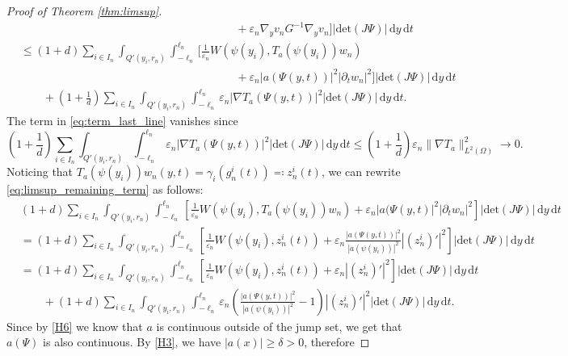 \documentclass[a4paper, 11pt, reqno]{amsart}
\theoremstyle{plain}
\theoremstyle{definition}
\theoremstyle{remark}
\newcommand{\dd}{\,\mathrm{d}}
\begin{document}
\begin{proof}[Proof of Theorem \ref{thm:limsup}]
\begin{align}
    &\hspace{8cm}+ \varepsilon_n \nabla_y v_n G^{-1} \nabla_y v_n \bigg] | \mathrm{det}(J\Psi)| \dd y \dd t \nonumber \\
    &\leq (1+d) \sum_{i \in I_n} \int_{Q'(y_i,r_n)} \int_{-\ell_n}^{\ell_n} \bigg[ \frac{1}{\varepsilon_n} W(\psi(y_i), T_a(\psi(y_i))w_n) \nonumber \\
    &\hspace{8cm}+ \varepsilon_n |a(\Psi(y,t))|^2 | \partial_t w_n|^2 \bigg] | \mathrm{det}(J\Psi)| \dd y \dd t \label{eq:limsup_remaining_term} \\
    &\qquad+ \left( 1 + \frac1d \right) \sum_{i \in I_n} \int_{Q'(y_i,r_n)} \int_{-\ell_n}^{\ell_n} \varepsilon_n | \nabla T_a (\Psi(y,t)) |^2 | \mathrm{det}(J\Psi)| \dd y \dd t. \label{eq:term_last_line}
\end{align}
The term in \eqref{eq:term_last_line} vanishes since
$$ \left( 1 + \frac1d \right) \sum_{i \in I_n} \int_{Q'(y_i,r_n)} \int_{-\ell_n}^{\ell_n} \varepsilon_n | \nabla T_a(\Psi(y,t)) |^2 | \mathrm{det}(J\Psi)| \dd y \dd t \leq \left( 1 + \frac1d \right) \varepsilon_n \| \nabla T_a \|^2_{L^2(\Omega)} \to 0. $$
Noticing that $T_a(\psi(y_i)) w_n(y,t) = \gamma_i (g_n^i(t)) \eqqcolon z_n^i (t)$, we can rewrite \eqref{eq:limsup_remaining_term} as follows:
\begin{align}
    &(1+d) \sum_{i \in I_n} \int_{Q'(y_i,r_n)} \int_{-\ell_n}^{\ell_n} \left[ \frac{1}{\varepsilon_n} W(\psi(y_i), T_a(\psi(y_i))w_n) + \varepsilon_n |a(\Psi(y,t)|^2 | \partial_t w_n|^2 \right] | \mathrm{det} (J\Psi)| \dd y \dd t \nonumber \\
    &= (1+d) \sum_{i \in I_n} \int_{Q'(y_i,r_n)} \int_{-\ell_n}^{\ell_n} \left[ \frac{1}{\varepsilon_n} W(\psi(y_i), z_n^i(t)) + \varepsilon_n \frac{|a(\Psi(y,t))|^2}{|a(\psi(y_i))|^2} |(z_n^i)'|^2 \right] | \mathrm{det} (J\Psi)| \dd y \dd t \nonumber \\
    &= (1+d) \sum_{i \in I_n} \int_{Q'(y_i,r_n)} \int_{-\ell_n}^{\ell_n} \left[ \frac{1}{\varepsilon_n} W(\psi(y_i), z_n^i(t)) + \varepsilon_n | (z_n^i)' |^2 \right] | \mathrm{det} (J\Psi)| \dd y \dd t \label{eq:limsup_remaining_term_last}\\
    &\qquad+ (1+d) \sum_{i \in I_n} \int_{Q'(y_i,r_n)} \int_{-\ell_n}^{\ell_n} \varepsilon_n \left( \frac{|a(\Psi(y,t))|^2}{|a(\psi(y_i))|^2} - 1 \right) | (z_n^i)'|^2 | \mathrm{det} (J\Psi)| \dd y \dd t \label{eq:limsup_afraction}.
\end{align}
Since by \ref{H6} we know that $a$ is continuous outside of the jump set, we get that $a(\Psi)$ is also continuous. By \ref{H3}, we have $|a(x)| \geq \delta > 0$, therefore

\end{proof}
\end{document}
